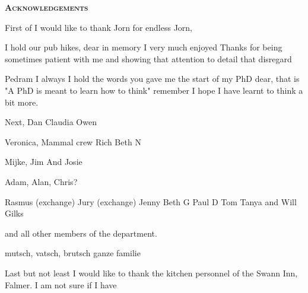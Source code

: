 \pagestyle{empty}%
\begin{center}
	\Huge \textsc{\textbf{Acknowledgements}}
	\hrulefill
\end{center}

First of I would like to thank Jorn for endless Jorn, 

I hold our pub hikes, dear in memory
I very much enjoyed 
Thanks for being sometimes patient with me and showing that attention to detail that disregard

Pedram
I always
I hold the words you gave me the start of my PhD dear, that is "A PhD is meant to learn how to think"
remember 
I hope I have learnt to think a bit more.

Next, 
Dan
Claudia
Owen

Veronica, Mammal crew
Rich
Beth N

Mijke, Jim And Josie

Adam, Alan, Chris?

Rasmus (exchange)
Jury (exchange)
Jenny
Beth G
Paul D
Tom
Tanya and 
Will Gilks

and all other members of the department.

mutsch, vatsch, brutsch
ganze familie

Last but not least I would like to thank the kitchen personnel of the Swann Inn, Falmer. 
I am not sure if I have 
